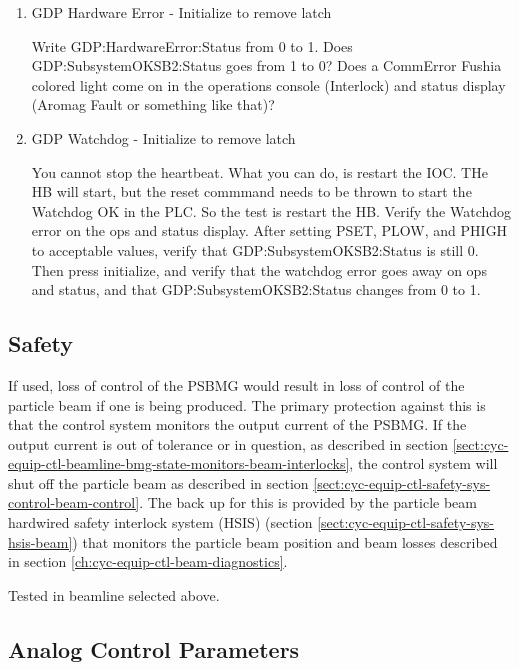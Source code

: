 \documentclass[11pt]{book}		%
\begin{document}
\begin{enumerate}
 \item GDP Hardware Error - Initialize to remove latch

\color{red}
Write GDP:HardwareError:Status from 0 to 1. Does GDP:SubsystemOKSB2:Status goes from 1 to 0? Does a CommError Fushia colored light come on in the operations console (Interlock) and status display (Aromag Fault or something like that)?
\color{black}


 \item GDP Watchdog - Initialize to remove latch

\color{red}
You cannot stop the heartbeat. What you can do, is restart the IOC. THe HB will start, but the reset commmand needs to be thrown to start the Watchdog OK in the PLC. So the test is restart the HB. Verify the Watchdog error on the ops and status display. After setting PSET, PLOW, and PHIGH to acceptable values, verify that GDP:SubsystemOKSB2:Status is still 0. Then press initialize, and verify that the watchdog error goes away on ops and status, and that GDP:SubsystemOKSB2:Status changes from 0 to 1.
\color{black}


\end{enumerate}


\subsection{Safety}

If used, loss of control of the PSBMG would result in loss of control of the particle beam if one is being produced.  The primary protection against this is that the control system monitors the output current of the PSBMG.  If the output current is out of tolerance or in question, as described in section \ref{sect:cyc-equip-ctl-beamline-bmg-state-monitors-beam-interlocks}, the control system will shut off the particle beam as described in section \ref{sect:cyc-equip-ctl-safety-sys-control-beam-control}.  The back up for this is provided by the particle beam hardwired safety interlock system (HSIS) (section \ref{sect:cyc-equip-ctl-safety-sys-hsis-beam}) that monitors the particle beam position and beam losses described in section \ref{ch:cyc-equip-ctl-beam-diagnostics}.


\color{red}

Tested in beamline selected above.

\color{black}

\subsection{Analog Control Parameters}
\end{document}
